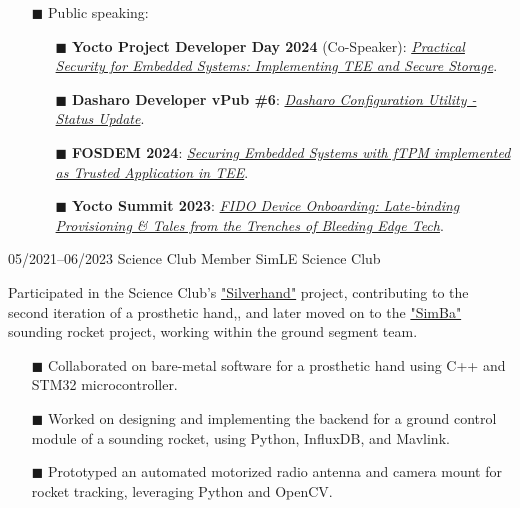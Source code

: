 \documentclass[9pt]{./src/packages/Developer_CV/developercv}
\begin{document}
\begin{entrylist}
{\begin{enumerate}
\begin{enumerate}
        \end{enumerate}
        \item[$\blacksquare$] Public speaking:
        \begin{enumerate}
            \item[$\blacksquare$] \textbf{Yocto Project Developer Day 2024} (Co-Speaker): {\href{https://www.youtube.com/watch?v=W78AKeWh57g}{\textit{Practical Security for Embedded Systems: Implementing TEE and Secure Storage}}}.
            \item[$\blacksquare$] \textbf{Dasharo Developer vPub \#6}: {\href{https://www.youtube.com/watch?v=9vBZeIZnS3o}{\textit{Dasharo Configuration Utility - Status Update}}}.
            \item[$\blacksquare$] \textbf{FOSDEM 2024}: {\href{https://archive.fosdem.org/2024/schedule/event/fosdem-2024-3097-securing-embedded-systems-with-ftpm-implemented-as-trusted-application-in-tee/}{\textit{Securing Embedded Systems with fTPM implemented as Trusted Application in TEE}}}.
            \item[$\blacksquare$] \textbf{Yocto Summit 2023}: {\href{https://www.youtube.com/watch?v=Wg1ZUdwTYNM&t=1s}{\textit{FIDO Device Onboarding: Late-binding Provisioning \& Tales from the Trenches of Bleeding Edge Tech}}}.
        \end{enumerate}
    \end{enumerate}
    }
    \entry
        {05/2021--06/2023}
        {Science Club Member}
        {SimLE Science Club}
        {
            Participated in the Science Club’s \href{https://simle.pl/en/projekty/silverhand/}{"Silverhand"} project, contributing to the second iteration of a prosthetic hand,, and later moved on to the \href{https://simle.pl/en/projekty/simba/}{"SimBa"} sounding rocket project, working within the ground segment team.
        \begin{enumerate}
            \item[$\blacksquare$] Collaborated on bare-metal software for a prosthetic hand using C++ and STM32 microcontroller.
            \item[$\blacksquare$] Worked on designing and implementing the backend for a ground control module of a sounding rocket, using Python, InfluxDB, and Mavlink.
            \item[$\blacksquare$] Prototyped an automated motorized radio antenna and camera mount for rocket tracking, leveraging Python and OpenCV.
        \end{enumerate}
        }


\end{entrylist}
\end{document}
